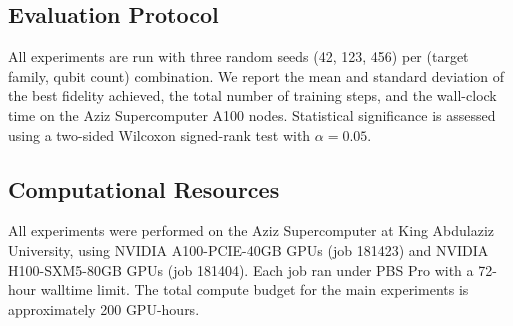 \subsection{Evaluation Protocol}

All experiments are run with three random seeds (42, 123, 456) per
(target family, qubit count) combination. We report the mean and standard
deviation of the best fidelity achieved, the total number of training steps,
and the wall-clock time on the Aziz Supercomputer A100 nodes. Statistical
significance is assessed using a two-sided Wilcoxon signed-rank test with
$\alpha = 0.05$.

\subsection{Computational Resources}

All experiments were performed on the Aziz Supercomputer at King Abdulaziz
University, using NVIDIA A100-PCIE-40GB GPUs (job 181423) and
NVIDIA H100-SXM5-80GB GPUs (job 181404). Each job ran under PBS Pro with
a 72-hour walltime limit. The total compute budget for the main experiments
is approximately 200 GPU-hours.
